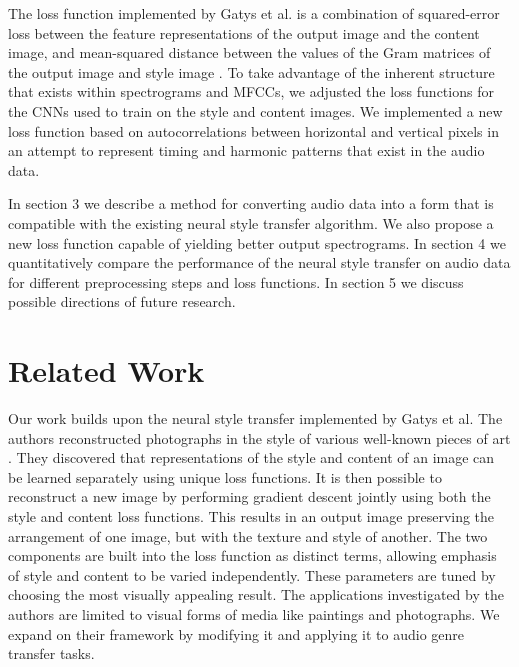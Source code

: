 \documentclass{article}
\begin{document}
The loss function implemented by Gatys et al. is a combination of squared-error loss between the feature representations of the output image and the content image, and mean-squared distance between the values of the Gram matrices of the output image and style image \citep{Gatys2015}. To take advantage of the inherent structure that exists within spectrograms and MFCCs, we adjusted the loss functions for the CNNs used to train on the style and content images. We implemented a new loss function based on autocorrelations between horizontal and vertical pixels in an attempt to represent timing and harmonic patterns that exist in the audio data.

In section 3 we describe a method for converting audio data into a form that is compatible with the existing neural style transfer algorithm. We also propose a new loss function capable of yielding better output spectrograms. In section 4 we quantitatively compare the performance of the neural style transfer on audio data for different preprocessing steps and loss functions. In section 5 we discuss possible directions of future research.


\section{Related Work}

Our work builds upon the neural style transfer implemented by Gatys et al. The authors reconstructed photographs in the style of various well-known pieces of art \citep{Gatys2015}. They discovered that representations of the style and content of an image can be learned separately using unique loss functions. It is then possible to reconstruct a new image by performing gradient descent jointly using both the style and content loss functions. This results in an output image preserving the arrangement of one image, but with the texture and style of another. The two components are built into the loss function as distinct terms, allowing emphasis of style and content to be varied independently. These parameters are tuned by choosing the most visually appealing result. The applications investigated by the authors are limited to visual forms of media like paintings and photographs. We expand on their framework by modifying it and applying it to audio genre transfer tasks.
\end{document}
